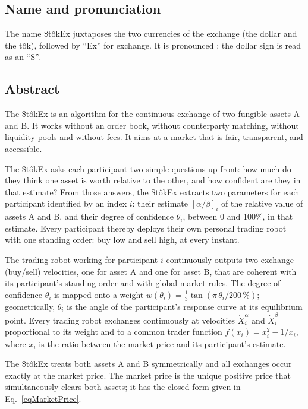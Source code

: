 \documentclass[letterpaper]{article}
\newcommand{\priceAB}{\left[\alpha / \beta\right]}
\newcommand{\StokEx}{\$t\^{o}kEx}
\begin{document}
\subsection*{Name and pronunciation} %
The name \StokEx{} juxtaposes the two currencies of the exchange (the dollar and the t\^{o}k), followed by ``Ex'' for exchange.
It is pronounced \textipa{[stOkEks]}: the dollar sign is read as an ``S''.

\subsection*{Abstract} %
The \StokEx{} is an algorithm for the continuous exchange of two fungible assets A and B.
It works without an order book, without counterparty matching, without liquidity pools and without fees.
It aims at a market that is fair, transparent, and accessible.

The \StokEx{} asks each participant two simple questions up front:
how much do they think one asset is worth relative to the other,
and how confident are they in that estimate?
From those answers, the \StokEx{} extracts two parameters for each participant identified by an index $i$:
their estimate $\priceAB_i$ of the relative value of assets A and B,
and their degree of confidence $\theta_i$, between 0 and 100\%, in that estimate.
Every participant thereby deploys their own personal trading robot with one standing order:
buy low and sell high, at every instant.

The trading robot working for participant $i$ continuously outputs two exchange (buy/sell) velocities,
one for asset A and one for asset B,
that are coherent with its participant's standing order and with global market rules.
The degree of confidence $\theta_i$ is mapped onto a weight $w(\theta_i) = \frac{1}{3}\tan\left(\pi\,\theta_i/200\,\%\right)$;
geometrically, $\theta_i$ is the angle of the participant's response curve at its equilibrium point.
Every trading robot exchanges continuously at velocities $\dot{X}_i^\alpha$ and $\dot{X}_i^\beta$
proportional to its weight and to a common trader function $f(x_i) = x_i^2 - 1/x_i$,
where $x_i$ is the ratio between the market price and its participant's estimate.

The \StokEx{} treats both assets A and B symmetrically and all exchanges occur exactly at the market price.
The market price is the unique positive price that simultaneously clears both assets;
it has the closed form given in Eq.~\eqref{eqMarketPrice}.
\end{document}
